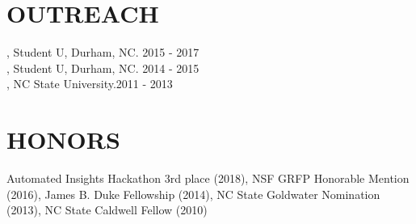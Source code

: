 \documentclass[resmargin, 11pt]{resume_style_class} %
\begin{document}
\begin{resume}
\section{OUTREACH}
\raggedright
{}, Student U, Durham, NC. \hfill 2015 - 2017 \\
, Student U, Durham, NC. \hfill 2014 - 2015 \\
, NC State University.\hfill 2011 - 2013  

\section{HONORS}
Automated Insights Hackathon 3rd place (2018),
NSF GRFP Honorable Mention (2016),
James B. Duke Fellowship (2014),
NC State Goldwater Nomination (2013),
NC State Caldwell Fellow (2010)
\end{resume}
\end{document}
